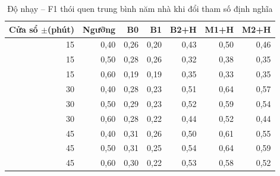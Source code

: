 \begin{table}[htbp]
\centering
\caption{Độ nhạy -- F1 thói quen trung bình năm nhà khi đổi tham số định nghĩa}
\label{tab:sensitivity}
\small
\begin{tabular}{rrrrrrr}
\toprule
Cửa sổ $\pm$(phút) & Ngưỡng & B0 & B1 & B2+H & M1+H & M2+H \\
\midrule
15 & 0{,}40 & 0{,}26 & 0{,}20 & 0{,}43 & 0{,}50 & 0{,}46 \\
15 & 0{,}50 & 0{,}28 & 0{,}26 & 0{,}32 & 0{,}38 & 0{,}35 \\
15 & 0{,}60 & 0{,}19 & 0{,}19 & 0{,}35 & 0{,}33 & 0{,}35 \\
30 & 0{,}40 & 0{,}28 & 0{,}23 & 0{,}51 & 0{,}64 & 0{,}57 \\
30 & 0{,}50 & 0{,}29 & 0{,}23 & 0{,}52 & 0{,}59 & 0{,}54 \\
30 & 0{,}60 & 0{,}28 & 0{,}22 & 0{,}44 & 0{,}52 & 0{,}44 \\
45 & 0{,}40 & 0{,}31 & 0{,}26 & 0{,}50 & 0{,}61 & 0{,}55 \\
45 & 0{,}50 & 0{,}31 & 0{,}25 & 0{,}54 & 0{,}64 & 0{,}59 \\
45 & 0{,}60 & 0{,}30 & 0{,}22 & 0{,}53 & 0{,}58 & 0{,}52 \\
\bottomrule
\end{tabular}
\end{table}
